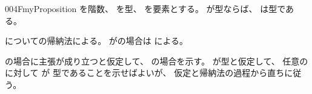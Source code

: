 \documentclass[index]{subfiles}
\begin{document}
\begin{myBlock}{004F}{myProposition}
  を階数、
  を型、
  を要素とする。
  が型ならば、
  は型である。
\end{myBlock}
\begin{myProof}
  についての帰納法による。
  が\myInlineMath{\myTLMinusTwo}の場合は
  による。

  の場合に主張が成り立つと仮定して、
  の場合を示す。
  が型と仮定して、
  任意のに対して
  が
  型であることを示せばよいが、
  仮定と帰納法の過程から直ちに従う。
\end{myProof}
\end{document}
